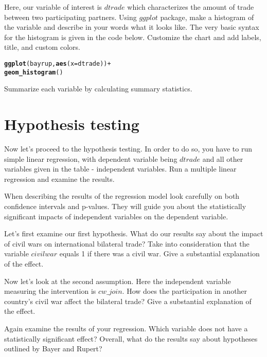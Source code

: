 \documentclass{article}\usepackage[]{graphicx}\usepackage[]{color}
\makeatletter
\newcommand{\hlopt}[1]{\textcolor[rgb]{0,0,0}{#1}}%
\newcommand{\hlstd}[1]{\textcolor[rgb]{0.345,0.345,0.345}{#1}}%
\newcommand{\hlkwc}[1]{\textcolor[rgb]{0.333,0.667,0.333}{#1}}%
\newcommand{\hlkwd}[1]{\textcolor[rgb]{0.737,0.353,0.396}{\textbf{#1}}}%
\newenvironment{kframe}{%
 \def\at@end@of@kframe{}%
 \ifinner\ifhmode%
  \def\at@end@of@kframe{\end{minipage}}%
  \begin{minipage}{\columnwidth}%
 \fi\fi%
 \def\FrameCommand##1{\hskip\@totalleftmargin \hskip-\fboxsep
 \colorbox{shadecolor}{##1}\hskip-\fboxsep
     \hskip-\linewidth \hskip-\@totalleftmargin \hskip\columnwidth}%
 \MakeFramed {\advance\hsize-\width
   \@totalleftmargin\z@ \linewidth\hsize
   \@setminipage}}%
 {\par\unskip\endMakeFramed%
 \at@end@of@kframe}
\newenvironment{knitrout}{}{} %
\makeatother
\begin{document}
Here, our variable of interest is $dtrade$ which characterizes the amount of trade between two participating partners. Using $ggplot$ package, make a histogram of the variable and describe in your words what it looks like. The very basic syntax for the histogram is given in the code below. Customize the chart and add labels, title, and custom colors.

\begin{knitrout}
\color{fgcolor}\begin{kframe}
\begin{alltt}
\hlkwd{ggplot}\hlstd{(bayrup,} \hlkwd{aes}\hlstd{(}\hlkwc{x}\hlstd{=dtrade))}\hlopt{+}
  \hlkwd{geom_histogram}\hlstd{()}
\end{alltt}
\end{kframe}
\end{knitrout}

Summarize each variable by calculating summary statistics.

\section*{Hypothesis testing}

Now let's proceed to the hypothesis testing. In order to do so, you have to run simple linear regression, with dependent variable being $dtrade$ and all other variables given in the table - independent variables. Run a multiple linear regression and examine the results.

When describing the results of the regression model look carefully on both confidence intervals and p-values. They will guide you about the statistically significant impacts of independent variables on the dependent variable.

Let's first examine our first hypothesis. What do our results say about the impact of civil wars on international bilateral trade? Take into consideration that the variable $civilwar$ equals 1 if there was a civil war. Give a substantial explanation of the effect.

Now let's look at the second assumption. Here the independent variable measuring the intervention is $cw\_join$. How does the participation in another country's civil war affect the bilateral trade? Give a substantial explanation of the effect.

Again examine the results of your regression. Which variable does not have a statistically significant effect? Overall, what do the results say about hypotheses outlined by Bayer and Rupert?
\end{document}
